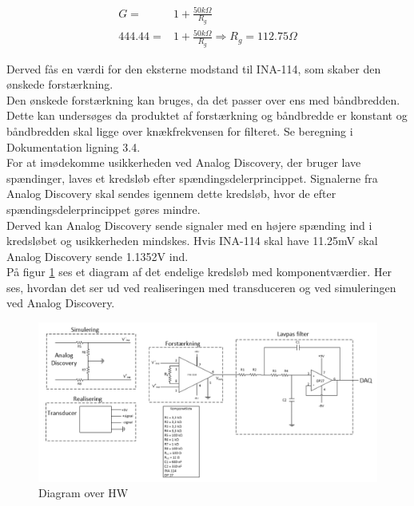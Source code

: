 \begin{ceqn}
\begin{equation}
\begin{split}
G=&1+\frac{50k\Omega}{R_g}\\
444.44=& 1+\frac{50k\Omega}{R_g} \Rightarrow R_g= 112.75 \Omega
\end{split}
\end{equation}
\end{ceqn}
Derved fås en værdi for den eksterne modstand til INA-114, som skaber den ønskede forstærkning.\\
\newline
Den ønskede forstærkning kan bruges, da det passer over ens med båndbredden. Dette kan undersøges da produktet af forstærkning og båndbredde er konstant og båndbredden skal ligge over knækfrekvensen for filteret. Se beregning i Dokumentation ligning 3.4.\\
\newline 
For at imødekomme usikkerheden ved Analog Discovery, der bruger lave spændinger, laves et kredsløb efter spændingsdelerprincippet. Signalerne fra Analog Discovery skal sendes igennem dette kredsløb, hvor de efter spændingsdelerprincippet gøres mindre.\\  
Derved kan Analog Discovery sende signaler med en højere spænding ind i kredsløbet og usikkerheden mindskes. Hvis INA-114 skal have 11.25mV skal Analog Discovery sende 1.1352V ind.  
\\
\newline 
På figur \ref{fig:HW} ses et diagram af det endelige kredsløb med komponentværdier. Her ses, hvordan det ser ud ved realiseringen med transduceren og ved simuleringen ved Analog Discovery. 
\begin{figure}[H]
	\centering
	\includegraphics[width=1.0\textwidth]{Figurer/diagram_over_HW}
	\caption{Diagram over HW}
	\label{fig:HW}
\end{figure}

